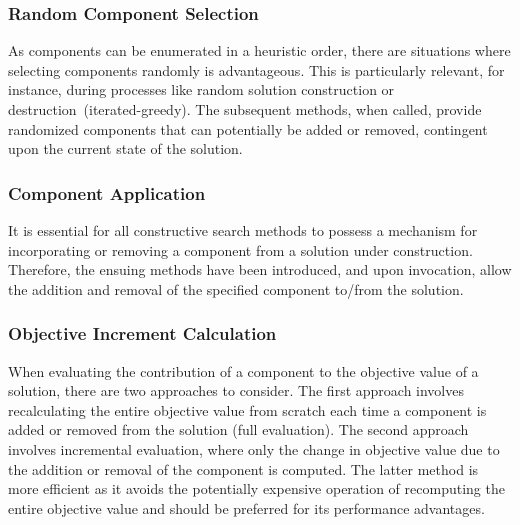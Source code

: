 \begin{center}

\end{center}

\subsubsection*{Random Component Selection}

As components can be enumerated in a heuristic order, there are situations where
selecting components randomly is advantageous. This is particularly relevant,
for instance, during processes like random solution construction or
destruction~(\acrshort{iterated-greedy}). The subsequent methods, when called,
provide randomized components that can potentially be added or removed,
contingent upon the current state of the solution.

\begin{center}

\end{center}

\subsubsection*{Component Application}

It is essential for all constructive search methods to possess a mechanism for
incorporating or removing a component from a solution under construction.
Therefore, the ensuing methods have been introduced, and upon invocation, allow
the addition and removal of the specified component to/from the solution.

\begin{center}

\end{center}

\subsubsection*{Objective Increment Calculation}

When evaluating the contribution of a component to the objective value of a
solution, there are two approaches to consider. The first approach involves
recalculating the entire objective value from scratch each time a component is
added or removed from the solution (full evaluation). The second approach
involves incremental evaluation, where only the change in objective value due to
the addition or removal of the component is computed. The latter method is
more efficient as it avoids the potentially expensive operation of recomputing
the entire objective value and should be preferred for its performance advantages.

